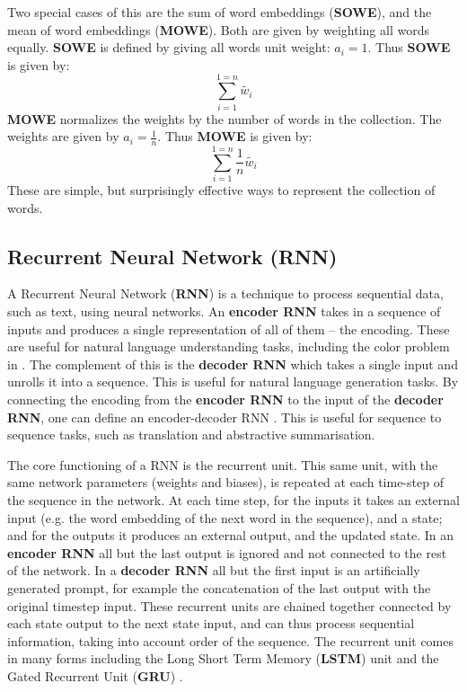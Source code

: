 \documentclass{book}
\begin{document}
Two special cases of this are the sum of word embeddings (\textbf{SOWE}), and the mean of word embeddings (\textbf{MOWE}).
Both are given by weighting all words equally.
\textbf{SOWE} is defined by giving all words unit weight: $a_i = 1$.
Thus \textbf{SOWE} is given by:
\begin{equation}
\sum_{i=1}^{1=n} \tilde{w_i}
\end{equation}
\textbf{MOWE} normalizes the weights by the number of words in the collection.
The weights are given by $a_i = \frac{1}{n}$.
Thus \textbf{MOWE} is given by:
\begin{equation}
\sum_{i=1}^{1=n}  \frac{1}{n} \tilde{w_i}
\end{equation}
These  are simple, but surprisingly effective ways to represent the collection of words.

\subsection {Recurrent Neural Network (RNN)}
A Recurrent Neural Network (\textbf{RNN}) is a technique 
to process sequential data, such as text, using neural networks.
An \textbf{encoder RNN} takes in a sequence of inputs and produces a single representation of all of them
-- the encoding.
These are useful for natural language understanding tasks, including the color problem in .
The complement of this is the \textbf{decoder RNN} which takes a single input and unrolls it into a sequence.
This is useful for natural language generation tasks.
By connecting the encoding from the \textbf{encoder RNN} to the input of the \textbf{decoder RNN},
one can define an encoder-decoder RNN \citep{cho2014properties}.
This is  useful for sequence to sequence tasks, such as translation and abstractive summarisation.

The core functioning of a RNN is the recurrent unit.
This  same unit, with the same network parameters (weights and biases),
is repeated at each time-step of the sequence in the network.
At each time step, for the inputs it takes an external input (e.g. the word embedding of the next word in the sequence), and a state;
and for the outputs it produces an external output, and the updated state.
In an \textbf{encoder RNN} all but the last output is ignored and not connected to the rest of the network.
In a \textbf{decoder RNN} all but the first input is an artificially generated prompt, for example the concatenation of the last output with the original timestep input.
These recurrent units are chained together connected by each state output to the next state input,
and can thus process sequential information, taking into account order of the sequence.
The recurrent unit comes in many forms including the 
Long Short Term Memory (\textbf{LSTM}) unit \citep{hochreiter1997long,gers1999learning}
and the Gated Recurrent Unit (\textbf{GRU})  \citep{chung2014empirical,cho2014properties}.
\end{document}
